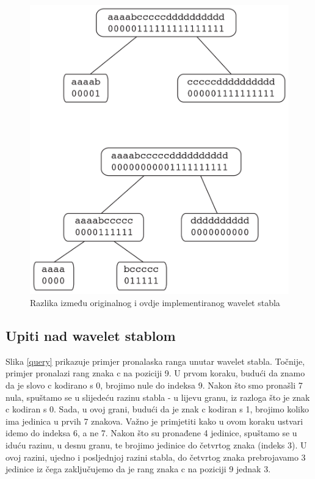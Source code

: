 \begin{figure}[H]
\centering
\includegraphics[scale=0.2]{./pictures/Waveletusporedba.jpg}
\caption{Razlika između originalnog i ovdje implementiranog wavelet stabla}\label{usporedba}
\end{figure}



\subsection{Upiti nad wavelet stablom}
Slika \ref{query} prikazuje primjer pronalaska ranga unutar wavelet stabla. Točnije, primjer pronalazi rang znaka c na poziciji 9. U prvom koraku, budući da znamo da je slovo c kodirano s 0, brojimo nule do indeksa 9. Nakon što smo pronašli 7 nula, spuštamo se u slijedeću razinu stabla - u lijevu granu, iz razloga što je znak c kodiran s 0. Sada, u ovoj grani, budući da je znak c kodiran s 1, brojimo koliko ima jedinica u prvih 7 znakova. Važno je primjetiti kako u ovom koraku ustvari idemo do indeksa 6, a ne 7. Nakon što su pronađene 4 jedinice, spuštamo se u iduću razinu, u desnu granu, te brojimo jedinice do četvrtog znaka (indeks 3). U ovoj razini, ujedno i posljednjoj razini stabla, do četvrtog znaka prebrojavamo 3 jedinice iz čega zaključujemo da je rang znaka c na poziciji 9 jednak 3.

